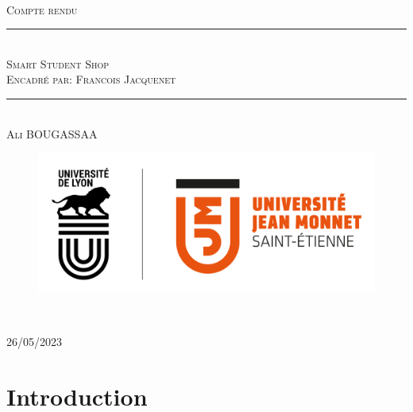 \documentclass[a4paper, 12pt]{article}
\newcommand{\HRule}{\rule{\linewidth}{0.5mm}}
\begin{document}
\begin{titlepage}
  \begin{sffamily}
  \begin{center}

   
  \textsc{\LARGE }\\[2cm]

    \textsc{\Large Compte rendu}

    \HRule \\[0.4cm]
    { \huge  \textsc{Smart Student Shop} \\
    \textsc{\small Encadré par: Francois Jacquenet}\\ [0.4cm] }
	

    \HRule \\[2cm]
    \textsc {Ali BOUGASSAA}
 \begin{figure}
     \centering
    \includegraphics[scale=0.2]{logoUJM.png}
     \label{fig:ujm_logo}
 \end{figure}
   
    \

    \vfill

    {\large {} 26/05/2023}

  \end{center}
  \end{sffamily}
\end{titlepage}


\newpage
\tableofcontents

\newpage

\section{Introduction}
    
\end{document}
